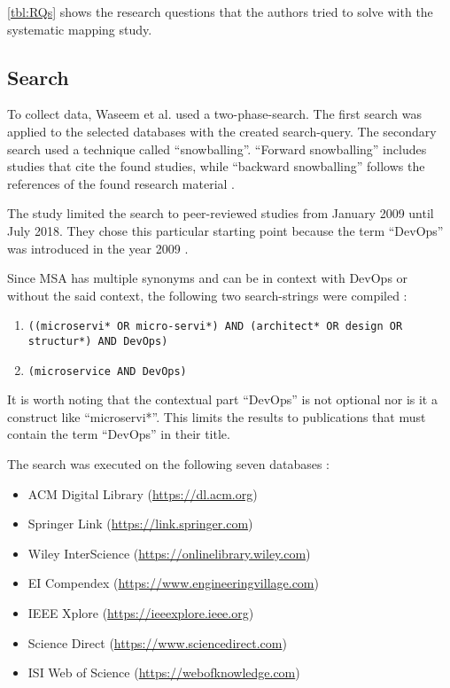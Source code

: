 \autoref{tbl:RQs} shows the research questions that the authors
tried to solve with the systematic mapping study.

\subsection{Search}

To collect data, Waseem et al. used a two-phase-search. The first search was applied
to the selected databases with the created search-query. The secondary
search used a technique called ``snowballing''. ``Forward snowballing''
includes studies that cite the found studies, while ``backward snowballing''
follows the references of the found research material \cite{wohlin:Snowballing}.

The study limited the search to peer-reviewed studies from January 2009 until
July 2018. They chose this particular starting point because the term ``DevOps''
was introduced in the year 2009 \cite{waseem:SMSMSADevOps}.

Since MSA has multiple synonyms and can be in context with DevOps or without
the said context, the following two search-strings were compiled \cite{waseem:SMSMSADevOps}:

\begin{enumerate}
    \item \texttt{((microservi* OR micro-servi*)
              AND (architect* OR design OR structur*) AND DevOps)}
    \item \texttt{(microservice AND DevOps)}
\end{enumerate}

It is worth noting that the contextual part ``DevOps'' is not optional nor is
it a construct like ``microservi*''. This limits the results to publications
that must contain the term ``DevOps'' in their title.

The search was executed on the following seven databases \cite{waseem:SMSMSADevOps}:

\begin{itemize}
    \item ACM Digital Library (\url{https://dl.acm.org})
    \item Springer Link (\url{https://link.springer.com})
    \item Wiley InterScience (\url{https://onlinelibrary.wiley.com})
    \item EI Compendex (\url{https://www.engineeringvillage.com})
    \item IEEE Xplore (\url{https://ieeexplore.ieee.org})
    \item Science Direct (\url{https://www.sciencedirect.com})
    \item ISI Web of Science (\url{https://webofknowledge.com})
\end{itemize}

